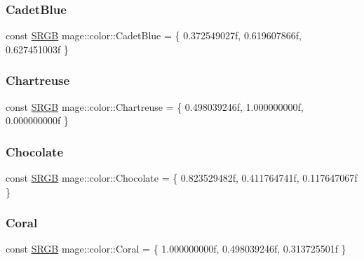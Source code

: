 \subsubsection{\texorpdfstring{Cadet\+Blue}{CadetBlue}}
{\footnotesize\ttfamily const \hyperlink{structmage_1_1_s_r_g_b}{S\+R\+GB} mage\+::color\+::\+Cadet\+Blue = \{ 0.\+372549027f, 0.\+619607866f, 0.\+627451003f \}}

\hypertarget{namespacemage_1_1color_a072c68c96e4f696ee0ced31c86e6b063}{}\label{namespacemage_1_1color_a072c68c96e4f696ee0ced31c86e6b063} 
\subsubsection{\texorpdfstring{Chartreuse}{Chartreuse}}
{\footnotesize\ttfamily const \hyperlink{structmage_1_1_s_r_g_b}{S\+R\+GB} mage\+::color\+::\+Chartreuse = \{ 0.\+498039246f, 1.\+000000000f, 0.\+000000000f \}}

\hypertarget{namespacemage_1_1color_aad9f5faedbfead46c11c283abdf107af}{}\label{namespacemage_1_1color_aad9f5faedbfead46c11c283abdf107af} 
\subsubsection{\texorpdfstring{Chocolate}{Chocolate}}
{\footnotesize\ttfamily const \hyperlink{structmage_1_1_s_r_g_b}{S\+R\+GB} mage\+::color\+::\+Chocolate = \{ 0.\+823529482f, 0.\+411764741f, 0.\+117647067f \}}

\hypertarget{namespacemage_1_1color_a890585ac33883ed7d67ad67b6e2c5013}{}\label{namespacemage_1_1color_a890585ac33883ed7d67ad67b6e2c5013} 
\subsubsection{\texorpdfstring{Coral}{Coral}}
{\footnotesize\ttfamily const \hyperlink{structmage_1_1_s_r_g_b}{S\+R\+GB} mage\+::color\+::\+Coral = \{ 1.\+000000000f, 0.\+498039246f, 0.\+313725501f \}}

\hypertarget{namespacemage_1_1color_a2c406920b36ce736cfff0dbbeae97631}{}\label{namespacemage_1_1color_a2c406920b36ce736cfff0dbbeae97631} 
